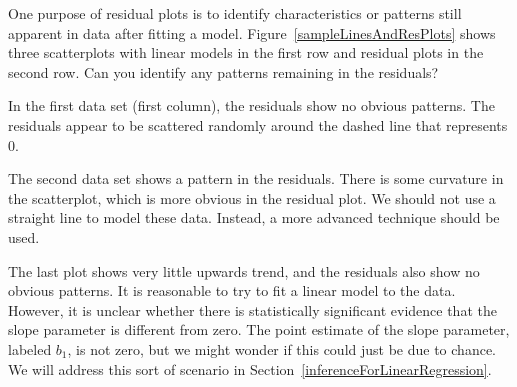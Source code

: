 \begin{examplewrap}
\begin{nexample}{One purpose of residual plots is to identify
    characteristics or patterns still apparent in data after
    fitting a model.
    Figure~\ref{sampleLinesAndResPlots} shows three scatterplots
    with linear models in the first row and residual plots in the
    second row.
    Can you identify any patterns remaining in the residuals?}

  In the first data set (first column), the residuals show
  no obvious patterns.
  The residuals appear to be scattered randomly around the
  dashed line that represents 0.

  The second data set shows a pattern in the residuals.
  There is some curvature in the scatterplot, which is more
  obvious in the residual plot.
  We should not use a straight line to model these data.
  Instead, a more advanced technique should be used.

  The last plot shows very little upwards trend, and the
  residuals also show no obvious patterns.
  It is reasonable to try to fit a linear model to the data.
  However, it is unclear whether there is statistically
  significant evidence that the slope parameter is different
  from zero.
  The point estimate of the slope parameter, labeled $b_1$,
  is not zero, but we might wonder if this could just be due
  to chance.
  We will address this sort of scenario in
  Section~\ref{inferenceForLinearRegression}.
\end{nexample}
\end{examplewrap}

